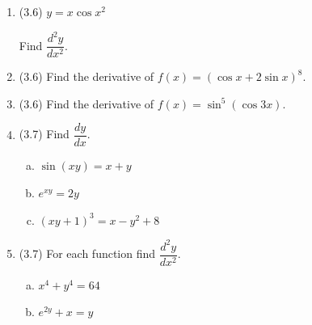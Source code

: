 \documentclass[11pt,letterpaper]{article}
\begin{document}
\begin{enumerate}[I.]
\begin{enumerate}[1.]
	\item (3.6) $y=x\cos{x^2}$
	
	Find $\displaystyle\dfrac{d^2y}{dx^2}$.
	
	\item (3.6) Find the derivative of $f(x)=(\cos x+2\sin x)^8$.
	
	\item (3.6) Find the derivative of $f(x)=\sin^5{(\cos{3x})}$.
	
	\item (3.7) Find $\displaystyle\dfrac{dy}{dx}$.
		\begin{enumerate}[(a)]
		\item $\sin{(xy)}=x+y$
		\item $e^{xy}=2y$
		\item $(xy+1)^3=x-y^2+8$
		\end{enumerate}
		
	\item (3.7) For each function find $\displaystyle\dfrac{d^2y}{dx^2}$.
		\begin{enumerate}[(a)]
		\item $x^4+y^4=64$
		\item $e^{2y}+x=y$
		\end{enumerate}
	
	\end{enumerate}

\end{enumerate}
\end{document}
